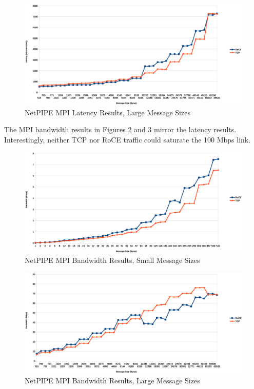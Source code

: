 \documentclass[a4paper]{article}
\begin{document}
\begin{figure}[H]
\includegraphics[width=\textwidth]{netpipe_lat_large}
\caption{NetPIPE MPI Latency Results, Large Message Sizes}
\label{npmpi-hlat}
\end{figure}

The MPI bandwidth results in Figures \ref{npmpi-lbw} and \ref{npmpi-hbw} mirror
the latency results. Interestingly, neither TCP nor RoCE traffic could saturate
the 100 Mbps link. %

\begin{figure}[H]
\includegraphics[width=\textwidth]{netpipe_bw_small}
\caption{NetPIPE MPI Bandwidth Results, Small Message Sizes}
\label{npmpi-lbw}
\end{figure}



\begin{figure}[H]
\includegraphics[width=\textwidth]{netpipe_bw_large}
\caption{NetPIPE MPI Bandwidth Results, Large Message Sizes}
\label{npmpi-hbw}
\end{figure}
\end{document}
